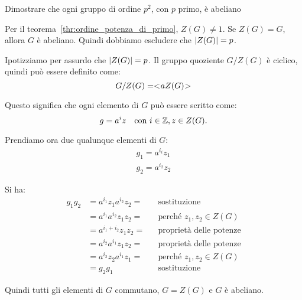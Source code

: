\begin{esercizio}
	Dimostrare che ogni gruppo di ordine $p^2$, con $p$ primo, è abeliano
\end{esercizio}
\begin{dimostrazione}
	Per il teorema~\ref{thr:ordine_potenza_di_primo}, $Z(G) \ne 1$.
	Se $Z(G) = G$, allora $G$ è abeliano.
	Quindi dobbiamo escludere che $\lvert Z(G) \rvert = p$.

	Ipotizziamo per assurdo che $\lvert Z(G) \rvert = p$.
	Il gruppo quoziente $G/Z(G)$ è ciclico, quindi può essere definito come:
	\begin{equation*}
		G/Z(G) = < \negmedspace a Z(G) \negmedspace >
	\end{equation*}

	Questo significa che ogni elemento di $G$ può essere scritto come:
	\begin{equation*}
		g = a^i z \quad \text{con } i \in \mathbb{Z}, z \in Z(G).
	\end{equation*}

	Prendiamo ora due qualunque elementi di $G$:
	\begin{gather*}
		g_1 = a^{i_i} z_1 \\
		g_2 = a^{i_2} z_2
	\end{gather*}

	Si ha:
	\begin{align*}
		g_1 g_2 &= a^{i_1} z_1 a^{i_2} z_2 = && \text{sostituzione} \\
		&= a^{i_1} a^{i_2} z_1 z_2 = && \text{perché $z_1, z_2 \in Z(G)$} \\
		&= a^{i_1 + i_2} z_1 z_2 = && \text{proprietà delle potenze} \\
		&= a^{i_2} a^{i_1} z_1 z_2 = && \text{proprietà delle potenze} \\
		&= a^{i_2} z_2 a^{i_1} z_1 = && \text{perché $z_1, z_2 \in Z(G)$} \\
		&= g_2 g_1 && \text{sostituzione}
	\end{align*}

	Quindi tutti gli elementi di $G$ commutano, $G = Z(G)$ e $G$ è abeliano.
\end{dimostrazione}

